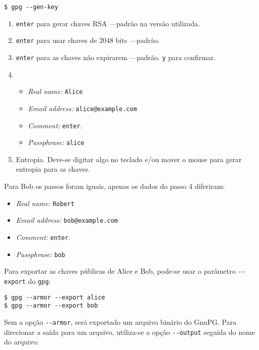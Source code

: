 \documentclass[12px,a4paper,twoside]{article}
\begin{document}
\begin{verbatim}
$ gpg --gen-key
\end{verbatim}

\begin{enumerate}
    \item \texttt{enter} para gerar chaves RSA ---padrão na versão utilizada.
    \item \texttt{enter} para usar chaves de 2048 bits ---padrão.
    \item \texttt{enter} para as chaves não expirarem ---padrão. \texttt{y}
        para confirmar.
    \item \begin{itemize}
            \item \textit{Real name:} \texttt{Alice}
            \item \textit{Email address:} \texttt{alice@example.com}
            \item \textit{Comment:} \texttt{enter}.
            \item \textit{Passphrase:} \texttt{alice}
          \end{itemize}
    \item Entropia. Deve-se digitar algo no teclado e/ou mover o mouse para
        gerar entropia para as chaves.
\end{enumerate}

Para Bob os passos foram iguais, apenas os dados do passo 4 diferiram:

\begin{itemize}
    \item \textit{Real name:} \texttt{Robert}
    \item \textit{Email address:} \texttt{bob@example.com}
    \item \textit{Comment:} \texttt{enter}.
    \item \textit{Passphrase:} \texttt{bob}
\end{itemize}

Para exportar as chaves públicas de Alice e Bob, pode-se usar o parâmetro
\texttt{-{}-export} do \texttt{gpg}:

\begin{verbatim}
$ gpg --armor --export alice
$ gpg --armor --export bob
\end{verbatim}

Sem a opção \texttt{-{}-armor}, será exportado um arquivo binário do GnuPG.
Para direcionar a saída para um arquivo, utiliza-se a opção \texttt{-{}-output}
seguida do nome do arquivo:
\end{document}
